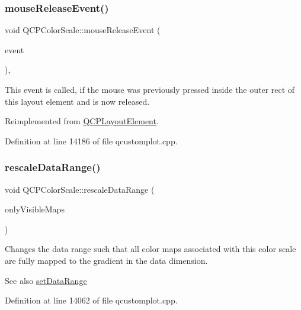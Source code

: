 \subsubsection{\texorpdfstring{mouse\+Release\+Event()}{mouseReleaseEvent()}}
{\footnotesize\ttfamily void Q\+C\+P\+Color\+Scale\+::mouse\+Release\+Event (\begin{DoxyParamCaption}\item[{Q\+Mouse\+Event $\ast$}]{event }\end{DoxyParamCaption})\hspace{0.3cm}{\ttfamily [protected]}, {\ttfamily [virtual]}}

This event is called, if the mouse was previously pressed inside the outer rect of this layout element and is now released. 

Reimplemented from \hyperlink{class_q_c_p_layout_element_ae526ac828cce1e5bb94eaa85776d7404}{Q\+C\+P\+Layout\+Element}.



Definition at line 14186 of file qcustomplot.\+cpp.

\mbox{\label{class_q_c_p_color_scale_a425983db4478543924ddbd04ea20a356}} 
\subsubsection{\texorpdfstring{rescale\+Data\+Range()}{rescaleDataRange()}}
{\footnotesize\ttfamily void Q\+C\+P\+Color\+Scale\+::rescale\+Data\+Range (\begin{DoxyParamCaption}\item[{bool}]{only\+Visible\+Maps }\end{DoxyParamCaption})}

Changes the data range such that all color maps associated with this color scale are fully mapped to the gradient in the data dimension.

\begin{DoxySeeAlso}{See also}
\hyperlink{class_q_c_p_color_scale_abe88633003a26d1e756aa74984587fef}{set\+Data\+Range} 
\end{DoxySeeAlso}


Definition at line 14062 of file qcustomplot.\+cpp.

\mbox{\label{class_q_c_p_color_scale_ab9dcc0c1cd583477496209b1413bcb99}} 
